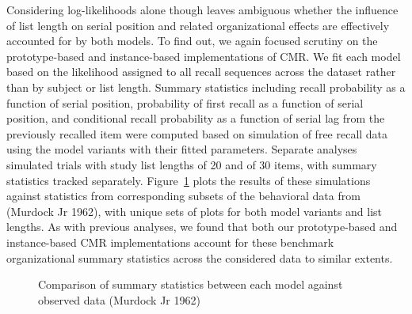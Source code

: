 \documentclass[
  letterpaper,
  DIV=11]{article}
\begin{document}
Considering log-likelihoods alone though leaves ambiguous whether the
influence of list length on serial position and related organizational
effects are effectively accounted for by both models. To find out, we
again focused scrutiny on the prototype-based and instance-based
implementations of CMR. We fit each model based on the likelihood
assigned to all recall sequences across the dataset rather than by
subject or list length. Summary statistics including recall probability
as a function of serial position, probability of first recall as a
function of serial position, and conditional recall probability as a
function of serial lag from the previously recalled item were computed
based on simulation of free recall data using the model variants with
their fitted parameters. Separate analyses simulated trials with study
list lengths of 20 and of 30 items, with summary statistics tracked
separately. Figure~\ref{fig-murd62summary} plots the results of these
simulations against statistics from corresponding subsets of the
behavioral data from (Murdock Jr 1962), with unique sets of plots for
both model variants and list lengths. As with previous analyses, we
found that both our prototype-based and instance-based CMR
implementations account for these benchmark organizational summary
statistics across the considered data to similar extents.

\begin{figure}

\newline
{}

\caption{\label{fig-murd62summary}Comparison of summary statistics
between each model against observed data (Murdock Jr 1962)}

\end{figure}
\end{document}
